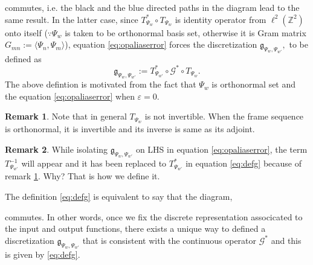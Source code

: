 \documentclass[reqno,10pt]{amsart}
\theoremstyle{plain}
\theoremstyle{definition}
\newtheorem{rem}{Remark}
\newcommand{\bb}[1]{\mathbb{#1}}
\newcommand{\cal}[1]{\mathcal{#1}}
\begin{document}
    \begin{figure}[!ht]
    \end{figure}
    commutes, i.e. the black and the blue directed paths in the diagram lead to the same result. In the latter case, since $T^*_{\Psi_w} \circ T_{\Psi_w}$ is identity operator from $\ell^2(\bb Z^2)$ onto itself ($\because \Psi_w$ is taken to be orthonormal basis set, otherwise it is Gram matrix $G_{mn} := \langle \Psi_n,\Psi_m\rangle$), equation \ref{eq:opaliaserror} forces the discretization $\mathfrak{g}_{\Psi_w,\Psi_{w'}},$ to be defined as
    \begin{equation}\label{eq:defg}
        \mathfrak{g}_{\Psi_w,\Psi_{w'}} := T^*_{\Psi_{w'}} \circ \cal G^* \circ T_{\Psi_w}.
    \end{equation}
    The above defintion is motivated from the fact that $\Psi_w$ is orthonormal set and the equation \ref{eq:opaliaserror} when $\varepsilon = 0$.
    \begin{rem}\label{rem:invert}
        Note that in general $T_{\Psi_w}$ is not invertible. When the frame sequence is orthonormal, it is invertible and its inverse is same as its adjoint.
    \end{rem}
    \begin{rem}
        While isolating $\mathfrak{g}_{\Psi_w,\Psi_{w'}}$ on LHS in equation \ref{eq:opaliaserror}, the term $T^{-1}_{\Psi_{w'}}$ will appear and it has been replaced to $T^*_{\Psi_{w'}}$ in equation \ref{eq:defg} because of remark \ref{rem:invert}. Why? That is how we define it. 
    \end{rem}
    \noindent The definition \ref{eq:defg} is equivalent to say that the diagram,
    \begin{figure}[!ht]
    \end{figure}
    commutes. In other words, once we fix the discrete representation associcated to the input and output functions, there exists a unique way to defined a discretization $\mathfrak{g}_{\Psi_w,\Psi_{w'}}$ that is consistent with the continuous operator $\cal G^*$ and this is given by \ref{eq:defg}.
\end{document}

